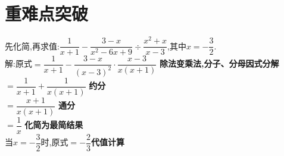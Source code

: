 \documentclass[cn,blue,12pt]{elegantbook}
\begin{document}
\section{重难点突破}%
\label{sec:重难点突破}
\begin{liti}[resume]
\item 先化简,再求值:\(\dfrac{1}{x+1}-\dfrac{3-x}{x^2-6x+9}\div \dfrac{x^2+x}{x-3}\),其中\(x=-\dfrac{3}{2}\).\\
    解:原式\(=\dfrac{1}{x+1}-\dfrac{3-x}{(x-3)^2}\cdot \dfrac{x-3}{x(x+1)}\) \qquad \textbf{除法变乘法,分子、分母因式分解}\\
\(=\dfrac{1}{x+1}+\dfrac{1}{x(x+1)}\) \qquad \textbf{约分}\\
\(=\dfrac{x+1}{x(x+1)}\) \qquad \textbf{通分}\\
\(=\dfrac{1}{x}\) \qquad \textbf{化简为最简结果}\\
当\( x =-\dfrac{3}{2}\)时,原式\(= -\dfrac{2}{3}\)\qquad \textbf{代值计算}


\end{liti}
\end{document}
